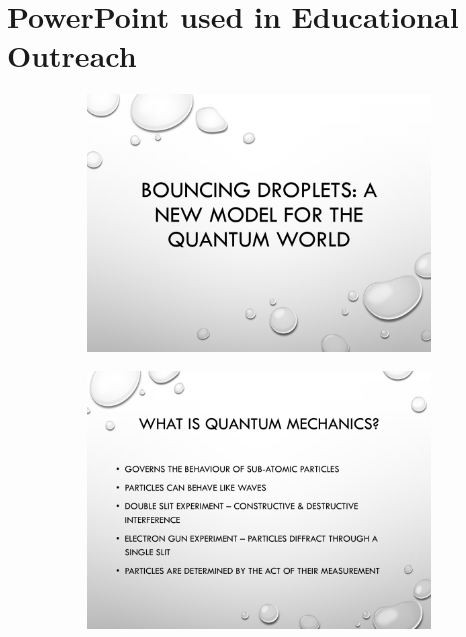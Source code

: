 \section{PowerPoint used in Educational Outreach} \label{app:powerpoint}

\begin{figure}[hb]
\begin{subfigure}{0.475\textwidth}
\includegraphics[width=\textwidth]{education/ppt/01.png}
\end{subfigure}
\hfill
\begin{subfigure}{0.475\textwidth}
\includegraphics[width=\textwidth]{education/ppt/02.png}
\end{subfigure}
\\


\end{figure}
